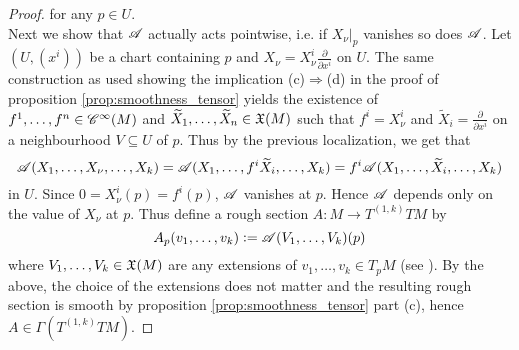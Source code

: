 \begin{appendix}
\begin{proof}
\noindent for any $p \in U$.\\
Next we show that $\mathscr{A}$ actually acts pointwise, i.e. if $X_\nu\vert_p$ vanishes so does $\mathscr{A}$. Let $(U,(x^i))$ be a chart containing $p$ and $X_\nu = X_\nu^i \frac{\partial}{\partial x^i}$ on $U$. The same construction as used showing the implication (c)$\Rightarrow$(d) in the proof of proposition \ref{prop:smoothness_tensor} yields the existence of $f^1,\dots,f^n \in \mathscr{C}^\infty(M)$ and $\widetilde{X}_1,\dots,\widetilde{X}_n \in \mathfrak{X}(M)$ such that $f^i = X_\nu^i$ and $\widetilde{X}_i = \frac{\partial}{\partial x^i}$ on a neighbourhood $V \subseteq U$ of $p$. Thus by the previous localization, we get that 
\begin{equation*}
\mathscr{A}(X_1,\dots,X_\nu,\dots,X_k) = \mathscr{A}(X_1,\dots,f^i\widetilde{X}_i,\dots,X_k) = f^i\mathscr{A}(X_1,\dots,\widetilde{X}_i,\dots,X_k) 
\end{equation*} 
\noindent in $U$. Since $0 = X_\nu^i(p) = f^i(p)$, $\mathscr{A}$ vanishes at $p$. Hence $\mathscr{A}$ depends only on the value of $X_\nu$ at $p$. Thus define a rough section $A : M \to T^{(1,k)}TM$ by 
\begin{equation*}
A_p(v_1,\dots,v_k) := \mathscr{A}(V_1,\dots,V_k)(p)
\end{equation*}
\noindent where $V_1,\dots,V_k \in \mathfrak{X}(M)$ are any extensions of $v_1,\dots,v_k \in T_pM$ (see \cite[177]{lee:smooth_manifolds:2013}). By the above, the choice of the extensions does not matter and the resulting rough section is smooth by proposition \ref{prop:smoothness_tensor} part (c), hence $A \in \Gamma(T^{(1,k)}TM)$.
\end{proof}

\end{appendix}

\printbibliography

